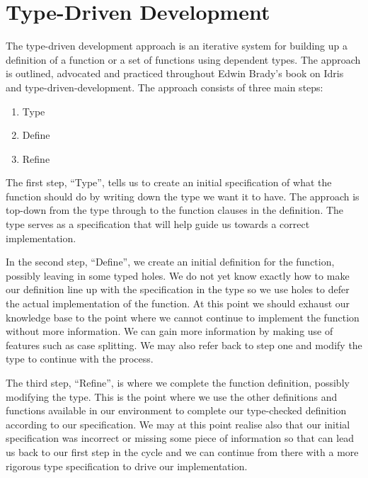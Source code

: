 \documentclass[a4paper, notitlepage]{report}
\begin{document}
\section{Type-Driven Development \label{sec-tdd}}
\label{sec:org4619479}
The type-driven development approach is an iterative system for building up a
definition of a function or a set of functions using dependent types. The
approach is outlined, advocated and practiced throughout Edwin Brady's book
\cite{brady_book_2017} on Idris and type-driven-development. The approach consists
of three main steps:
\begin{enumerate}
\item Type
\item Define
\item Refine
\end{enumerate}

The first step, ``Type'', tells us to create an initial specification of what
the function should do by writing down the type we want it to have. The approach
is top-down from the type through to the function clauses in the definition. The
type serves as a specification that will help guide us towards a correct
implementation.

In the second step, ``Define'', we create an initial definition for the
function, possibly leaving in some typed holes. We do not yet know exactly how
to make our definition line up with the specification in the type so we use
holes to defer the actual implementation of the function. At this point we
should exhaust our knowledge base to the point where we cannot continue to
implement the function without more information. We can gain more information by
making use of features such as case splitting. We may also refer back to step
one and modify the type to continue with the process.

The third step, ``Refine'', is where we complete the function definition,
possibly modifying the type. This is the point where we use the other
definitions and functions available in our environment to complete our
type-checked definition according to our specification. We may at this point
realise also that our initial specification was incorrect or missing some piece
of information so that can lead us back to our first step in the cycle and we
can continue from there with a more rigorous type specification to drive our
implementation.
\end{document}
